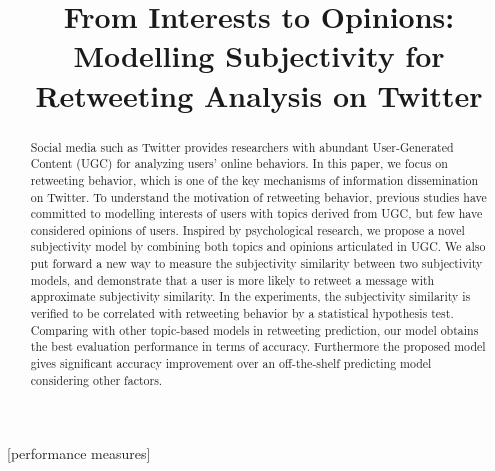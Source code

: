 \documentclass{acm_proc_article-sp}
\newcommand{\mo}[1]{\textcolor{red}{#1}}
\begin{document}
\title{From Interests to Opinions: Modelling Subjectivity for Retweeting Analysis on Twitter}

\maketitle
\begin{abstract}
Social media such as Twitter provides researchers with abundant User-Generated Content (UGC) for analyzing users' online behaviors. In this paper, we focus on retweeting behavior, which is one of the key mechanisms of information dissemination on Twitter. 
To understand the motivation of retweeting behavior, previous studies have committed to modelling interests of users with topics derived from UGC, but few have considered opinions of users. 
Inspired by psychological research, we propose a novel subjectivity model by combining both topics and opinions articulated in UGC. 
We also put forward a new way to measure the subjectivity similarity between two subjectivity models, and demonstrate that a user is more likely to retweet a message with approximate subjectivity similarity.  
In the experiments, the subjectivity similarity is verified to be correlated with retweeting behavior by a statistical hypothesis test. 
Comparing with other topic-based models in retweeting prediction, our model obtains the best evaluation performance in terms of accuracy. 
Furthermore the proposed model gives significant accuracy improvement over an off-the-shelf predicting model considering other factors.
\end{abstract}
[performance measures]
\end{document}
